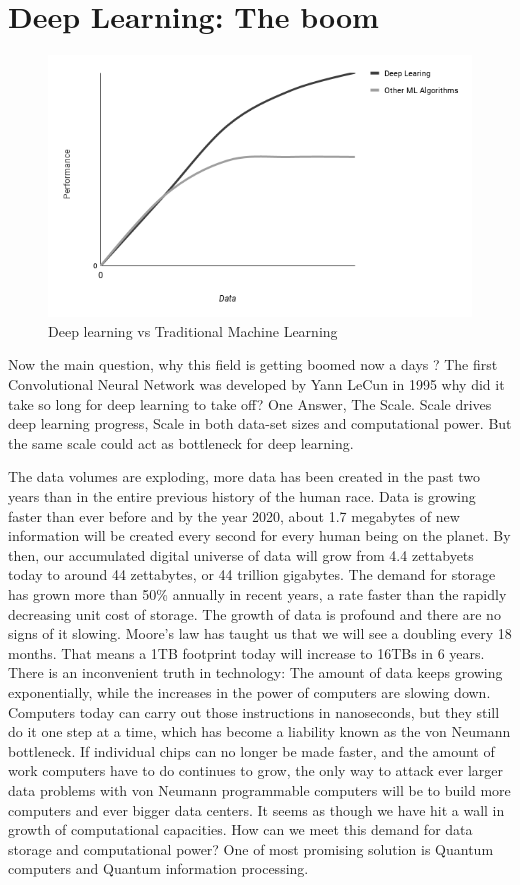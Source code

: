\section{Deep Learning: The boom}
\begin{figure}[H]
\centering\includegraphics[width=.6\textwidth]{images/chart.png}
\caption{Deep learning vs Traditional Machine Learning}
\end{figure}
Now the main question, why this field is getting boomed now a days ? The first Convolutional Neural Network was developed by Yann LeCun in 1995 \cite{lecun} why did it take so long for deep learning to take off? One Answer, The Scale. Scale drives deep learning progress, Scale in both data-set sizes and computational power. But the same scale could act as bottleneck for deep learning.\par\bigskip
The data volumes are exploding, more data has been created in the past two years than in the entire previous history of the human race. Data is growing faster than ever before and by the year 2020, about 1.7 megabytes of new information will be created every second for every human being on the planet. By then, our accumulated digital universe of data will grow from 4.4 zettabyets today to around 44 zettabytes, or 44 trillion gigabytes. The demand for storage has grown more than 50\% annually in recent years, a rate faster than the rapidly decreasing unit cost of storage. The growth of data is profound and there are no signs of it slowing. Moore’s law has taught us that we will see a doubling every 18 months. That means a 1TB footprint today will increase to 16TBs in 6 years. There is an inconvenient truth in technology: The amount of data keeps growing exponentially, while the increases in the power of computers are slowing down. Computers today can carry out those instructions in nanoseconds, but they still do it one step at a time, which has become a liability known as the von Neumann bottleneck. If individual chips can no longer be made faster, and the amount of work computers have to do continues to grow, the only way to attack ever larger data problems with von Neumann programmable computers will be to build more computers and ever bigger data centers. It seems as though we have hit a wall in growth of computational capacities. How can we meet this demand for data storage and computational power? One of most promising solution is Quantum computers and Quantum information processing.
